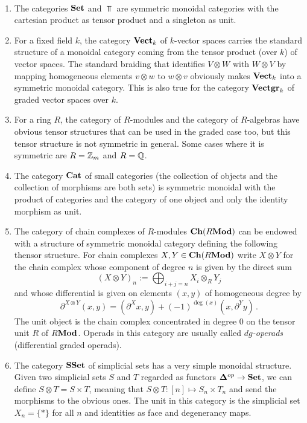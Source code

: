 \documentclass[TFM.tex]{subfiles}
\begin{document}
\begin{ex}\
\begin{enumerate}
\item The categories $\mathrm{\mathbf{Set}}$ and $\Top$ are symmetric monoidal categories with the cartesian product as tensor product and a singleton as unit. 
\item For a fixed field $k$, the category $\mathrm{\mathbf{Vect}}_k$ of $k$-vector spaces carries the standard structure of a monoidal category coming from the tensor product (over $k$) of vector spaces. The standard braiding that identifies $V\otimes W$ with $W\otimes V$ by mapping homogeneous elements $v\otimes w$ to $w\otimes v$ obviously makes $\mathrm{\mathbf{Vect}}_k$ into a symmetric monoidal category. This is also true for the category $\mathrm{\mathbf{Vectgr}}_k$ of graded vector spaces over $k$. 

\item For a ring $R$, the category of $R$-modules and the category of $R$-algebras have obvious tensor structures that can be used in the graded case too, but this tensor structure is not symmetric in general. Some cases where it is symmetric are $R=\mathbb{Z}_m$ and $R=\mathbb{Q}$. %

\item The category $\mathrm{\mathbf{Cat}}$ of small categories (the collection of objects and the collection of morphisms are both sets) is symmetric monoidal with the product of categories and the category of one object and only the identity morphism as unit.


\item The category of chain complexes of $R$-modules $\mathrm{\mathbf{Ch}}(R\mathrm{\mathbf{Mod}})$ can be endowed with a structure of symmetric monoidal category defining the following thensor structure. For chain complexes $X,Y\in\mathrm{\mathbf{Ch}}(R\mathrm{\mathbf{Mod}})$ write $X\otimes Y$ for the chain complex whose component of degree $n$ is given by the direct sum
\[
(X \otimes Y)_n := \bigoplus_{i + j = n} X_i \otimes_R Y_j
\]
and whose differential is given on elements $(x,y)$ of homogeneous degree by
\[
\partial^{X \otimes Y} (x, y) = (\partial^X x, y) + 
  (-1)^{\deg(x)} (x, \partial^Y y)
  \,.
\]
The unit object is the chain complex concentrated in degree 0 on the tensor unit $R$ of $R\mathrm{\mathbf{Mod}}$. Operads in this category are usually called \emph{$dg$-operads} (differential graded operads). 

\item The category $\mathrm{\mathbf{SSet}}$ of simplicial sets has a very simple monoidal structure. Given two simplicial sets $S$ and $T$ regarded as functors $\mathbf{\Delta}^{op}\to\mathrm{\mathbf{Set}}$, we can define $S\otimes T=S\times T$, meaning that $S\otimes T:[n]\mapsto S_n\times T_n$ and send the morphisms to the obvious ones. The unit in this category is the simplicial set $X_n=\{*\}$ for all $n$ and identities as face and degenerancy maps. 
\end{enumerate}



\end{ex}
\end{document}
